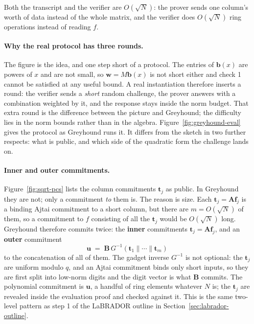 Both the transcript and the verifier are $O(\sqrt{N})$: the prover sends one
column's worth of data instead of the whole matrix, and the verifier does
$O(\sqrt{N})$ ring operations instead of reading $f$.

\paragraph{Why the real protocol has three rounds.}
The figure is the idea, and one step short of a protocol. The entries of
$\mathbf{b}(x)$ are powers of $x$ and are not small, so $\mathbf{w}=M\mathbf{b}(x)$
is not short either and check 1 cannot be satisfied at any useful bound. A real
instantiation therefore inserts a round: the verifier sends a \emph{short}
random challenge, the prover answers with a combination weighted by it, and the
response stays inside the norm budget. That extra round is the difference between
the picture and Greyhound; the difficulty lies in the norm bounds rather than
in the algebra. Figure~\ref{fig:greyhound-eval} gives the protocol as Greyhound
runs it. It differs from the sketch in two further respects: what is public,
and which side of the quadratic form the challenge lands on.

\paragraph{Inner and outer commitments.}
Figure~\ref{fig:sqrt-pcs} lists the column commitments $\mathbf{t}_j$ as public.
In Greyhound they are not; only a commitment \emph{to} them is. The reason is
size. Each $\mathbf{t}_j=\mathbf{A}\mathbf{f}_j$ is a binding Ajtai commitment
to a short column, but there are $m=O(\sqrt{N})$ of them, so a commitment to
$f$ consisting of all the $\mathbf{t}_j$ would be $O(\sqrt{N})$ long. Greyhound
therefore commits twice: the \textbf{inner} commitments
$\mathbf{t}_j=\mathbf{A}\mathbf{f}_j$, and an \textbf{outer} commitment
\[
  \mathbf{u}\;=\;\mathbf{B}\,G^{-1}(\mathbf{t}_1\|\cdots\|\mathbf{t}_m)
\]
to the concatenation of all of them. The gadget inverse $G^{-1}$ is not
optional: the $\mathbf{t}_j$ are uniform modulo $q$, and an Ajtai commitment
binds only short inputs, so they are first split into low-norm digits and the
digit vector is what $\mathbf{B}$ commits. The polynomial commitment is
$\mathbf{u}$, a handful of ring elements whatever $N$ is; the $\mathbf{t}_j$
are revealed inside the evaluation proof and checked against it. This is the
same two-level pattern as step 1 of the LaBRADOR outline in
Section~\ref{sec:labrador-outline}.

